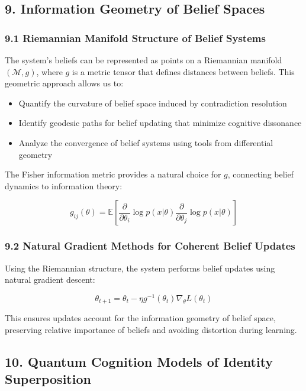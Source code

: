 \documentclass[
]{article}
\providecommand{\tightlist}{%
  \setlength{\itemsep}{0pt}\setlength{\parskip}{0pt}}
\begin{document}
\subsection{9. Information Geometry of Belief
Spaces}\label{information-geometry-of-belief-spaces}

\subsubsection{9.1 Riemannian Manifold Structure of Belief
Systems}\label{riemannian-manifold-structure-of-belief-systems}

The system's beliefs can be represented as points on a Riemannian
manifold \((\mathcal{M}, g)\), where \(g\) is a metric tensor that
defines distances between beliefs. This geometric approach allows us to:

\begin{itemize}
\tightlist
\item
  Quantify the curvature of belief space induced by contradiction
  resolution
\item
  Identify geodesic paths for belief updating that minimize cognitive
  dissonance
\item
  Analyze the convergence of belief systems using tools from
  differential geometry
\end{itemize}

The Fisher information metric provides a natural choice for \(g\),
connecting belief dynamics to information theory:

\[g_{ij}(\theta) = \mathbb{E}\left[\frac{\partial}{\partial \theta_i}\log p(x|\theta)\frac{\partial}{\partial \theta_j}\log p(x|\theta)\right]\]

\subsubsection{9.2 Natural Gradient Methods for Coherent Belief
Updates}\label{natural-gradient-methods-for-coherent-belief-updates}

Using the Riemannian structure, the system performs belief updates using
natural gradient descent:

\[\theta_{t+1} = \theta_t - \eta g^{-1}(\theta_t)\nabla_\theta L(\theta_t)\]

This ensures updates account for the information geometry of belief
space, preserving relative importance of beliefs and avoiding distortion
during learning.

\subsection{10. Quantum Cognition Models of Identity
Superposition}\label{quantum-cognition-models-of-identity-superposition}
\end{document}
